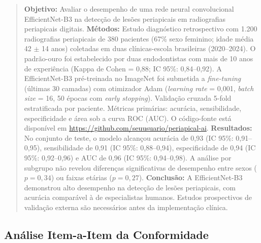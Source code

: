 \begin{quote}
\textbf{Objetivo:} Avaliar o desempenho de uma rede neural convolucional
EfficientNet-B3 na detecção de lesões periapicais em radiografias periapicais
digitais. \textbf{Métodos:} Estudo diagnóstico retrospectivo com 1.200
radiografias periapicais de 380 pacientes (67\% sexo feminino; idade média 42
$\pm$ 14 anos) coletadas em duas clínicas-escola brasileiras (2020--2024). O
padrão-ouro foi estabelecido por duas endodontistas com mais de 10 anos de
experiência (Kappa de Cohen = 0,88; IC 95\%: 0,84--0,92). A EfficientNet-B3
pré-treinada no ImageNet foi submetida a \textit{fine-tuning} (últimas 30
camadas) com otimizador Adam (\textit{learning rate} = 0,001, \textit{batch
size} = 16, 50 épocas com \textit{early stopping}). Validação cruzada 5-fold
estratificada por paciente. Métricas primárias: acurácia, sensibilidade,
especificidade e área sob a curva ROC (AUC). O código-fonte está disponível em
\url{https://github.com/seuusuario/periapical-ai}. \textbf{Resultados:} No
conjunto de teste, o modelo alcançou acurácia de 0,93 (IC 95\%: 0,91--0,95),
sensibilidade de 0,91 (IC 95\%: 0,88--0,94), especificidade de 0,94 (IC 95\%:
0,92--0,96) e AUC de 0,96 (IC 95\%: 0,94--0,98). A análise por subgrupo não
revelou diferenças significativas de desempenho entre sexos ($p = 0,34$) ou
faixas etárias ($p = 0,27$). \textbf{Conclusão:} A EfficientNet-B3 demonstrou
alto desempenho na detecção de lesões periapicais, com acurácia comparável à de
especialistas humanos. Estudos prospectivos de validação externa são necessários
antes da implementação clínica.
\end{quote}


\subsection{Análise Item-a-Item da Conformidade}

